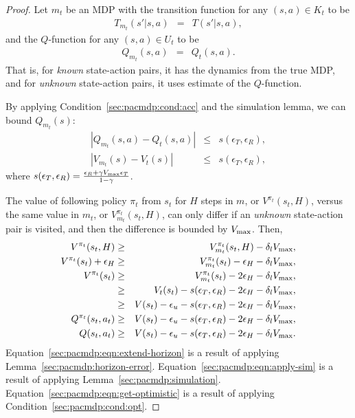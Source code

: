 \begin{proof}

Let $m_t$ be an MDP with the transition function for any $(s,a) \in K_t$ to be
\begin{eqnarray}
T_{m_t}(s'|s,a) &=& T(s'|s,a),
\end{eqnarray}
and the $Q$-function for any $(s,a) \in U_t$ to be
\begin{eqnarray}
Q_{m_t}(s,a) &=& Q_t(s,a).
\end{eqnarray}
That is, for \emph{known} state-action pairs, it has the dynamics from the true MDP, and for \emph{unknown} state-action pairs, it uses \As estimate of the $Q$-function.

By applying Condition~\ref{sec:pacmdp:cond:acc} and the simulation lemma, we can bound $Q_{m_t}(s)$:
\begin{eqnarray}
|Q_{m_t}(s,a) - Q_t(s,a)| &\leq& s(\epsilon_T,\epsilon_R),\\
|V_{m_t}(s) - V_t(s)| &\leq& s(\epsilon_T,\epsilon_R),
\end{eqnarray}
where $s(\epsilon_T,\epsilon_R) = \frac{ \epsilon_R + \gamma V_{\rm max}\epsilon_T }{1-\gamma}$.

The value of following policy $\pi_t$ from $s_t$ for $H$ steps in $m$, or $V^{\pi_t}(s_t,H)$, versus the same value in $m_t$, or $V^{\pi_t}_{m_t}(s_t,H)$, can only differ if an \emph{unknown} state-action pair is visited, and then the difference is bounded by $V_{\rm max}$. Then,
\begin{eqnarray}
V^{\pi_t}(s_t,H) &\geq& V^{\pi_t}_{m_t}(s_t,H) - \delta_lV_{\rm max},\\
\label{sec:pacmdp:eqn:extend-horizon}
V^{\pi_t}(s_t) + \epsilon_H  &\geq& V^{\pi_t}_{m_t}(s_t) - \epsilon_H - \delta_lV_{\rm max},\\
V^{\pi_t}(s_t) &\geq& V^{\pi_t}_{m_t}(s_t) - 2\epsilon_H - \delta_lV_{\rm max},\\
\label{sec:pacmdp:eqn:apply-sim}
 &\geq& V_t(s_t) - s(\epsilon_T,\epsilon_R) -2 \epsilon_H - \delta_lV_{\rm max},\\
\label{sec:pacmdp:eqn:get-optimistic}
 &\geq& V(s_t) - \epsilon_u - s(\epsilon_T,\epsilon_R) -2 \epsilon_H - \delta_lV_{\rm max},\\
Q^{\pi_t}(s_t,a_t) &\geq& V(s_t) - \epsilon_u - s(\epsilon_T,\epsilon_R) -2 \epsilon_H - \delta_lV_{\rm max},\\
Q(s_t,a_t) &\geq& V(s_t) - \epsilon_u - s(\epsilon_T,\epsilon_R) -2 \epsilon_H - \delta_lV_{\rm max}.
\end{eqnarray}
Equation~\ref{sec:pacmdp:eqn:extend-horizon} is a result of applying Lemma~\ref{sec:pacmdp:horizon-error}.
Equation~\ref{sec:pacmdp:eqn:apply-sim} is a result of applying Lemma~\ref{sec:pacmdp:simulation}.
Equation~\ref{sec:pacmdp:eqn:get-optimistic} is a result of applying Condition~\ref{sec:pacmdp:cond:opt}.



\end{proof}
